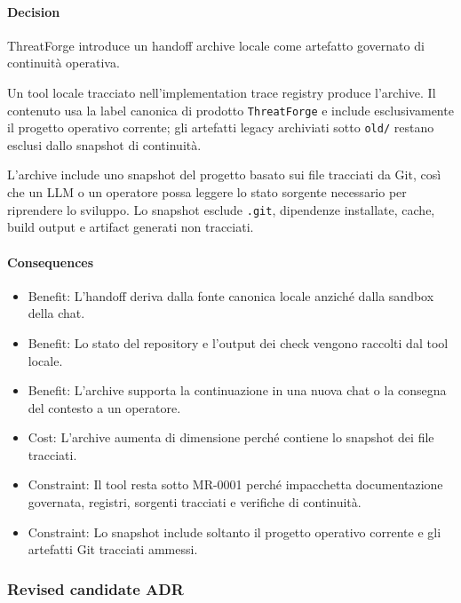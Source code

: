 \documentclass[
  10pt,
]{article}
\providecommand{\tightlist}{%
  \setlength{\itemsep}{0pt}\setlength{\parskip}{0pt}}
\begin{document}
\paragraph{Decision}\label{decision-8}

ThreatForge introduce un handoff archive locale come artefatto governato
di continuità operativa.

Un tool locale tracciato nell'implementation trace registry produce
l'archive. Il contenuto usa la label canonica di prodotto
\texttt{ThreatForge} e include esclusivamente il progetto operativo
corrente; gli artefatti legacy archiviati sotto \texttt{old/} restano
esclusi dallo snapshot di continuità.

L'archive include uno snapshot del progetto basato sui file tracciati da
Git, così che un LLM o un operatore possa leggere lo stato sorgente
necessario per riprendere lo sviluppo. Lo snapshot esclude
\texttt{.git}, dipendenze installate, cache, build output e artifact
generati non tracciati.

\paragraph{Consequences}\label{consequences-8}

\begin{itemize}
\tightlist
\item
  Benefit: L'handoff deriva dalla fonte canonica locale anziché dalla
  sandbox della chat.
\item
  Benefit: Lo stato del repository e l'output dei check vengono raccolti
  dal tool locale.
\item
  Benefit: L'archive supporta la continuazione in una nuova chat o la
  consegna del contesto a un operatore.
\item
  Cost: L'archive aumenta di dimensione perché contiene lo snapshot dei
  file tracciati.
\item
  Constraint: Il tool resta sotto MR-0001 perché impacchetta
  documentazione governata, registri, sorgenti tracciati e verifiche di
  continuità.
\item
  Constraint: Lo snapshot include soltanto il progetto operativo
  corrente e gli artefatti Git tracciati ammessi.
\end{itemize}

\subsubsection{Revised candidate ADR}\label{revised-candidate-adr-4}
\end{document}
